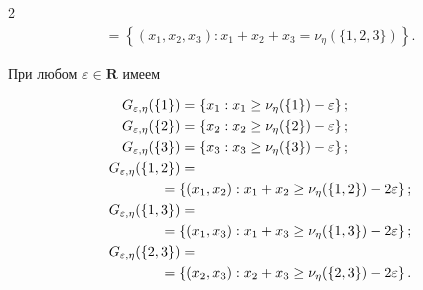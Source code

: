 \begin{multicols}{2}
\begin{multline*}
     {}=\left\{ (x_1, x_2, x_3): 

x_1+x_2+x_3=\nu_\eta(\{1,2,3\})\right\}.

     \end{multline*}

     

     \vspace*{-2pt}

     

     \noindent

При любом $\varepsilon\in \mathbf{R}$ имеем



\noindent

\begin{align*}

G_{\varepsilon,\eta}(\{1\}) &= \left\{ x_1: x_1\geq \nu_\eta(\{1\})-

\varepsilon\right\};\\

G_{\varepsilon,\eta}(\{2\}) &=\left\{ x_2: x_2\geq \nu_\eta(\{2\})-

\varepsilon\right\};\\

G_{\varepsilon,\eta}(\{3\}) &= \left\{ x_3: x_3\geq \nu_\eta(\{3\})-

\varepsilon\right\};\\

G_{\varepsilon,\eta}(\{1,2\}) &={}\\

&\hspace*{-5mm}{}= \left\{ (x_1,x_2): x_1+x_2\geq \nu_\eta(\{1,2\}) -

2\varepsilon\right\};\\

G_{\varepsilon,\eta}(\{1,3\}) &={}\\

&\hspace*{-5mm}{}= \left\{ (x_1,x_3): x_1+x_3\geq \nu_\eta(\{1,3\}) -

2\varepsilon\right\};\\

G_{\varepsilon,\eta}(\{2,3\}) &= {}\\

&\hspace*{-5mm}{}=\left\{ (x_2,x_3): x_2+x_3\geq \nu_\eta(\{2,3\}) -

2\varepsilon\right\}.

\end{align*}




\end{multicols}
